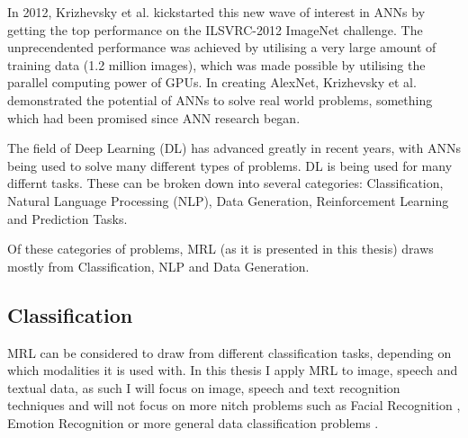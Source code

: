 In 2012, Krizhevsky et al. \cite{krizhevsky2012imagenet} kickstarted this new wave of interest in ANNs by getting the top performance on the ILSVRC-2012 ImageNet challenge. The unprecendented performance was achieved by utilising a very large amount of training data (1.2 million images), which was made possible by utilising the parallel computing power of GPUs. In creating AlexNet, Krizhevsky et al. demonstrated the potential of ANNs to solve real world problems, something which had been promised since ANN research began.

The field of Deep Learning (DL) has advanced greatly in recent years, with ANNs being used to solve many different types of problems. DL is being used for many differnt tasks. These can be broken down into several categories: Classification, Natural Language Processing (NLP), Data Generation, Reinforcement Learning and Prediction Tasks.


%   
%
%   
%   
%      

Of these categories of problems, MRL (as it is presented in this thesis) draws mostly from Classification, NLP and Data Generation.

\subsection{Classification}
MRL can be considered to draw from different classification tasks, depending on which modalities it is used with. In this thesis I apply MRL to image, speech and textual data, as such I will focus on image, speech and text recognition techniques and will not focus on more nitch problems such as Facial Recognition \cite{ma2004facial}, Emotion Recognition \cite{levi2015emotion} or more general data classification problems \cite{kussul2017deep,qi2017pointnet}.


